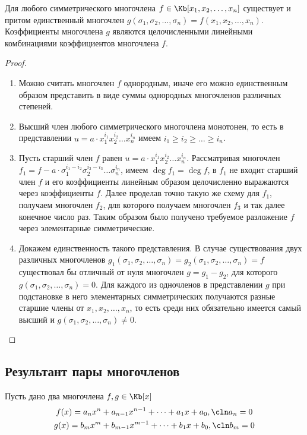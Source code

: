 \begin{theorem}
  Для любого симметрического многочлена $f\in\Kb[x_1,x_2,\dots,x_n]$ существует и притом единственный многочлен $g(\sigma_1,\sigma_2,\dots,\sigma_n)=f(x_1,x_2,\dots,x_n)$. Коэффициенты многочлена $g$ являются целочисленными линейными комбинациями коэффициентов многочлена $f$.
\end{theorem}
\begin{proof}
  \begin{enumerate}
    \item Можно считать многочлен $f$ однородным, иначе его можно единственным образом представить в виде суммы однородных многочленов различных степеней.
    \item Высший член любого симметрического многочлена монотонен, то есть в представлении $u=a\cdot x_1^{i_1}x_2^{i_2}\dots x_n^{i_n}$ имеем $i_1\ge i_2\ge\dots\ge i_n$.
    \item Пусть старший член $f$ равен $u=a\cdot x_1^{i_1}x_2^{i_2}\dots x_n^{i_n}$. Рассматривая многочлен $f_1=f - a\cdot\sigma_1^{i_1-i_2}\sigma_2^{i_2-i_3}\dots\sigma_n^{i_n}$, имеем $\deg f_1 = \deg f$, в $f_1$ не входит старший член $f$ и его коэффициенты линейным образом целочисленно выражаются через коэффициенты $f$. Далее проделав точно такую же схему для $f_1$, получаем многочлен $f_2$, для которого получаем многочлен $f_3$ и так далее конечное число раз. Таким образом было получено требуемое разложение $f$ через элементарные симметрические.
    \item Докажем единственность такого представления. В случае существования двух различных многочленов $g_1(\sigma_1, \sigma_2, \dots,\sigma_n)=g_2(\sigma_1, \sigma_2, \dots,\sigma_n)=f$ существовал бы отличный от нуля многочлен $g=g_1-g_2$, для которого $g(\sigma_1,\sigma_2,\dots,\sigma_n)=0$. Для каждого из одночленов в представлении $g$ при подстановке в него элементарных симметрических получаются разные старшие члены от $x_1,x_2,\dots,x_n$, то есть среди них обязательно имеется самый высший и $g(\sigma_1,\sigma_2,\dots,\sigma_n)\ne0$.
  \end{enumerate}
\end{proof}

\subsection{Результант пары многочленов}

Пусть дано два многочлена $f,g\in\Kb[x]$
\begin{gather*}
  f(x) = a_nx^n+a_{n-1}x^{n-1}+\dots+a_1x+a_0,\cln a_n = 0\\
  g(x) = b_mx^m+b_{m-1}x^{m-1}+\dots+b_1x+b_0,\cln b_m = 0
\end{gather*}

